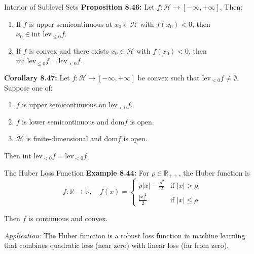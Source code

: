 \documentclass[aspectratio=169,10pt]{beamer}
\begin{document}
\begin{frame}[fragile]{Interior of Sublevel Sets}
    \textbf{Proposition 8.46:} Let $f : \mathcal{H} \to [-\infty, +\infty]$. Then:
    
    \begin{enumerate}
        \item If $f$ is upper semicontinuous at $x_0 \in \mathcal{H}$ with $f(x_0) < 0$, then $x_0 \in \text{int } \text{lev}_{\leq 0} f$.
        \item If $f$ is convex and there exists $x_0 \in \mathcal{H}$ with $f(x_0) < 0$, then $\text{int } \text{lev}_{\leq 0} f = \text{lev}_{< 0} f$.
    \end{enumerate}

    \vspace{0.3cm}

    \textbf{Corollary 8.47:} Let $f : \mathcal{H} \to [-\infty, +\infty]$ be convex such that $\text{lev}_{< 0} f \neq \emptyset$. 
    Suppose one of:
    
    \begin{enumerate}
        \item $f$ is upper semicontinuous on $\text{lev}_{< 0} f$.
        \item $f$ is lower semicontinuous and $\text{dom} f$ is open.
        \item $\mathcal{H}$ is finite-dimensional and $\text{dom} f$ is open.
    \end{enumerate}
    
    Then $\text{int } \text{lev}_{< 0} f = \text{lev}_{< 0} f$.
\end{frame}

\begin{frame}[fragile]{The Huber Loss Function}
    \textbf{Example 8.44:} For $\rho \in \mathbb{R}_{++}$, the Huber function is
    \[
    f : \mathbb{R} \to \mathbb{R}, \quad f(x) = \begin{cases}
        \rho|x| - \frac{\rho^2}{2} & \text{if } |x| > \rho \\
        \frac{|x|^2}{2} & \text{if } |x| \leq \rho
    \end{cases}
    \]
    
    Then $f$ is continuous and convex.

    \vspace{0.3cm}

    \textit{Application:} The Huber function is a robust loss function in machine learning that combines 
    quadratic loss (near zero) with linear loss (far from zero).
\end{frame}
\end{document}
